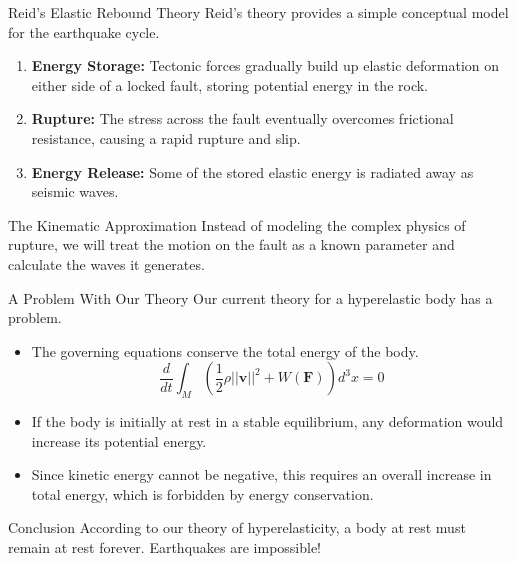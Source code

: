 \documentclass{beamer}
\begin{document}
\begin{frame}{Reid's Elastic Rebound Theory}
    Reid's theory provides a simple conceptual model for the earthquake cycle.
    \pause
    \begin{enumerate}
        \item \textbf{Energy Storage:} Tectonic forces gradually build up elastic deformation on either side of a locked fault, storing potential energy in the rock.
        \pause
        \item \textbf{Rupture:} The stress across the fault eventually overcomes frictional resistance, causing a rapid rupture and slip.
        \pause
        \item \textbf{Energy Release:} Some of the stored elastic energy is radiated away as seismic waves.
    \end{enumerate}
    \pause
    \begin{alertblock}{The Kinematic Approximation}
        Instead of modeling the complex physics of rupture, we will treat the motion on the fault as a known parameter and calculate the waves it generates.
    \end{alertblock}
\end{frame}


\begin{frame}{A Problem With Our Theory}
    Our current theory for a hyperelastic body has a problem.
    \begin{itemize}
        \item The governing equations conserve the total energy of the body.
        $$ \frac{d}{dt}\int_{M} \left( \frac{1}{2}\rho||\mathbf{v}||^2 + W(\mathbf{F}) \right) d^3x = 0 $$
        \pause
        \item If the body is initially at rest in a stable equilibrium, any deformation would increase its potential energy.
        \pause
        \item Since kinetic energy cannot be negative, this requires an overall increase in total energy, which is forbidden by energy conservation.
    \end{itemize}
    \pause
    \begin{alertblock}{Conclusion}
        According to our theory of hyperelasticity, a body at rest must remain at rest forever. Earthquakes are impossible!
    \end{alertblock}
\end{frame}
\end{document}
